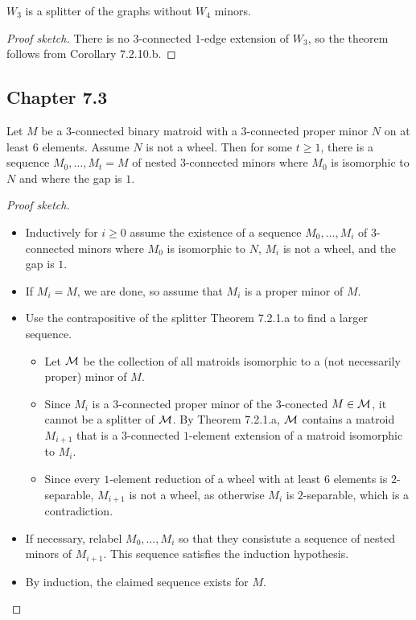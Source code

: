 \begin{theorem}[7.2.11.b]
  \label{thm:7.2.11.b}
  $W_{3}$ is a splitter of the graphs without $W_{4}$ minors.
\end{theorem}

\begin{proof}[Proof sketch]
  There is no $3$-connected $1$-edge extension of $W_{3}$, so the theorem follows from Corollary 7.2.10.b.
\end{proof}


\subsection{Chapter 7.3}

\begin{theorem}[7.3.1.a]
  \label{thm:7.3.1.a}
  \uses{}
  Let $M$ be a $3$-connected binary matroid with a $3$-connected proper minor $N$ on at least $6$ elements. Assume $N$ is not a wheel.
  Then for some $t \geq 1$, there is a sequence $M_{0}, \dots, M_{t} = M$ of nested $3$-connected minors where $M_{0}$ is isomorphic to $N$ and where the gap is $1$.
\end{theorem}

\begin{proof}[Proof sketch]
  \begin{itemize}
    \item Inductively for $i \geq 0$ assume the existence of a sequence $M_{0}, \dots, M_{i}$ of $3$-connected minors where $M_{0}$ is isomorphic to $N$, $M_{i}$ is not a wheel, and the gap is $1$.
    \item If $M_{i} = M$, we are done, so assume that $M_{i}$ is a proper minor of $M$.
    \item Use the contrapositive of the splitter Theorem 7.2.1.a to find a larger sequence.
    \begin{itemize}
      \item Let $\mathcal{M}$ be the collection of all matroids isomorphic to a (not necessarily proper) minor of $M$.
      \item Since $M_{i}$ is a $3$-connected proper minor of the $3$-conected $M \in \mathcal{M}$, it cannot be a splitter of $\mathcal{M}$. By Theorem 7.2.1.a, $\mathcal{M}$ contains a matroid $M_{i + 1}$ that is a $3$-connected $1$-element extension of a matroid isomorphic to $M_{i}$.
      \item Since every $1$-element reduction of a wheel with at least $6$ elements is $2$-separable, $M_{i + 1}$ is not a wheel, as otherwise $M_{i}$ is $2$-separable, which is a contradiction.
    \end{itemize}
    \item If necessary, relabel $M_{0}, \dots, M_{i}$ so that they consistute a sequence of nested minors of $M_{i + 1}$. This sequence satisfies the induction hypothesis.
    \item By induction, the claimed sequence exists for $M$.
  \end{itemize}
\end{proof}


